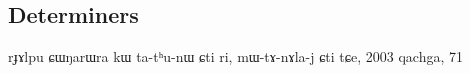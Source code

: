 %
%
%
%
%
%
%
%
%
%
%
%
%
%

\subsection{Determiners} \label{sec:determiners}
 rɟɤlpu ɕɯŋarɯra kɯ ta-tʰu-nɯ ɕti ri, mɯ-tɤ-nɤla-j ɕti tɕe,
 2003 qachga, 71